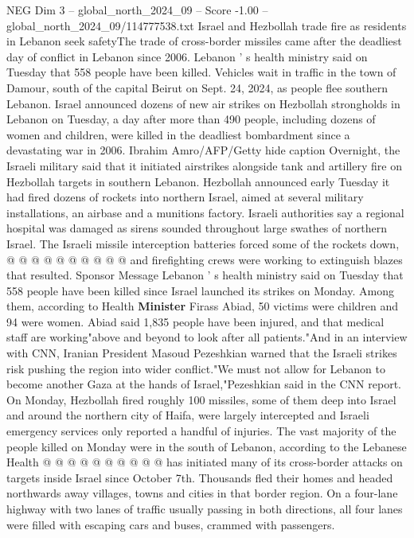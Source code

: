 \begin{textsample}{NEG Dim 3 – global\_north\_2024\_09 – Score -1.00 – global\_north\_2024\_09/114777538.txt}  \label{ex:f3_neg_292}
Israel and Hezbollah trade fire as residents in Lebanon seek safetyThe trade of cross-border missiles came after the deadliest day of conflict in Lebanon since 2006.
Lebanon ' s health ministry said on Tuesday that 558 people have been killed.
Vehicles wait in traffic in the town of Damour, south of the capital Beirut on Sept. 24, 2024, as people flee southern Lebanon.
Israel announced dozens of new air strikes on Hezbollah strongholds in Lebanon on Tuesday, a day after more than 490 people, including dozens of women and children, were killed in the deadliest bombardment since a devastating war in 2006.
Ibrahim Amro/AFP/Getty hide caption Overnight, the Israeli military said that it initiated airstrikes alongside tank and artillery fire on Hezbollah targets in southern Lebanon.
Hezbollah announced early Tuesday it had fired dozens of rockets into northern Israel, aimed at several military installations, an airbase and a munitions factory.
Israeli authorities say a regional hospital was damaged as sirens sounded throughout large swathes of northern Israel.
The Israeli missile interception batteries forced some of the rockets down, @ @ @ @ @ @ @ @ @ @ and firefighting crews were working to extinguish blazes that resulted.
Sponsor Message Lebanon ' s health ministry said on Tuesday that 558 people have been killed since Israel launched its strikes on Monday.
Among them, according to Health \textbf{Minister} Firass Abiad, 50 victims were children and 94 were women.
Abiad said 1,835 people have been injured, and that medical staff are working"above and beyond to look after all patients."And in an interview with CNN, Iranian President Masoud Pezeshkian warned that the Israeli strikes risk pushing the region into wider conflict."We must not allow for Lebanon to become another Gaza at the hands of Israel,"Pezeshkian said in the CNN report.
On Monday, Hezbollah fired roughly 100 missiles, some of them deep into Israel and around the northern city of Haifa, were largely intercepted and Israeli emergency services only reported a handful of injuries.
The vast majority of the people killed on Monday were in the south of Lebanon, according to the Lebanese Health @ @ @ @ @ @ @ @ @ @ has initiated many of its cross-border attacks on targets inside Israel since October 7th.
Thousands fled their homes and headed northwards away villages, towns and cities in that border region.
On a four-lane highway with two lanes of traffic usually passing in both directions, all four lanes were filled with escaping cars and buses, crammed with passengers.

\end{textsample}
